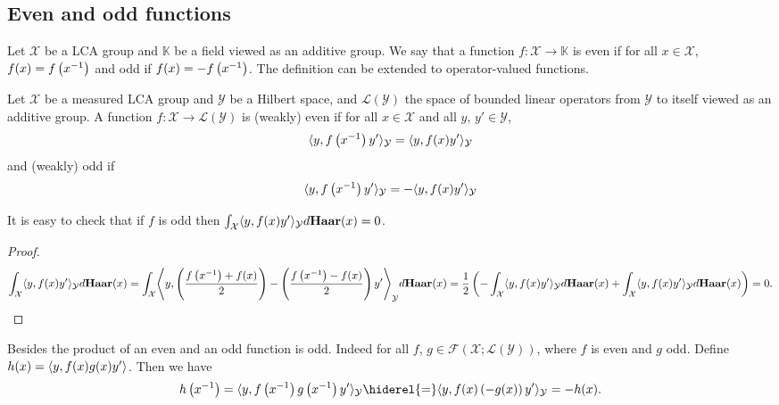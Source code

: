 \subsection{Even and odd functions}
Let $\mathcal{X}$ be a \ac{LCA} group and $\mathbb{K}$ be a field viewed as an
additive group. We say that a function $f:\mathcal{X}\to\mathbb{K}$ is even if
for all $x\in\mathcal{X}$, $f(x)=f\left({x}^{-1}\right)$ and odd if
$f(x)=-f\left({x}^{-1}\right)$. The definition can be extended to
operator-valued functions.
\begin{definition}
    Let $\mathcal{X}$ be a measured \ac{LCA} group and $\mathcal{Y}$ be a
    Hilbert space, and $\mathcal{L}(\mathcal{Y})$ the space of bounded linear
    operators from $\mathcal{Y}$ to itself viewed as an additive group. A
    function $f:\mathcal{X}\to\mathcal{L}(\mathcal{Y})$ is (weakly) even if for
    all $x\in\mathcal{X}$ and all $y$, $y'\in\mathcal{Y}$,
    \begin{dmath}
        \inner{y,f\left(\inv{x}\right)y'}_{\mathcal{Y}} =
        \inner{y,f(x)y'}_{\mathcal{Y}}
    \end{dmath}
    and (weakly) odd if
    \begin{dmath}
        \inner{y,f\left(\inv{x}\right)y'}_{\mathcal{Y}} =
        -\inner{y,f(x)y'}_{\mathcal{Y}}
    \end{dmath}
\end{definition}
It is easy to check that if $f$ is odd then
$\int_{\mathcal{X}}\langle y,f(x)y'\rangle_{\mathcal{Y}}d\mathbf{Haar}(x)=0$.
\begin{proof}
    \begin{dmath*}
        \int_{\mathcal{X}} \inner{y, f(x)y'}_{\mathcal{Y}} d\Haar(x) =
        \int_{\mathcal{X}} \inner*{y, \left(\frac{f\left(\inv{x}\right)
        + f(x)}{2}\right)-\left(\frac{f\left(\inv{x}\right) -
        f(x)}{2}\right)y'}_{\mathcal{Y}}d\Haar(x)
        =\frac{1}{2} \left(-\int_{\mathcal{X}} \inner{y, f(x)y'}_{\mathcal{Y}}
        d\Haar(x) + \int_{\mathcal{X}}\inner{y,
        f(x)y'}_{\mathcal{Y}}d\Haar(x)\right)
        =0.
    \end{dmath*}
\end{proof}
Besides the product of an even and an odd function is odd. Indeed for all $f$,
$g\in\mathcal{F}(\mathcal{X};\mathcal{L}(\mathcal{Y}))$, where $f$ is even and
$g$ odd. Define $h(x)=\langle y,f(x)g(x)y'\rangle$. Then we have
\begin{dmath}
    h\left(\inv{x}\right) = \inner{y, f\left(\inv{x}\right)
    g\left(\inv{x}\right)y'}_{\mathcal{Y}}
    \hiderel{=}\inner{y,f(x)\left(-g(x)\right)y'}_{\mathcal{Y}}
    =-h(x).
\end{dmath}
